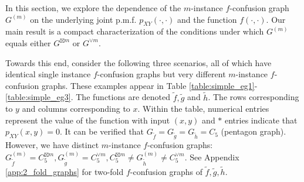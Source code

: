 \documentclass[journal, onecolumn, draftcls]{IEEEtran}
\theoremstyle{definition}
\begin{document}
In this section, we explore the dependence of the $m$-instance $f$-confusion graph $G^{(m)}$ on the underlying joint p.m.f. $p_{XY}(\cdot, \cdot)$ and the function $f(\cdot, \cdot)$. Our main result is a compact characterization of the conditions under which $G^{(m)}$ equals either $G^{\boxtimes m}$ or $G^{\lor m}$.

Towards this end, consider the following three scenarios, all of which have identical single instance $f$-confusion graphs but very different $m$-instance $f$-confusion graphs. These examples appear in  Table \ref{table:simple_eg1}-\ref{table:simple_eg3}. The functions are denoted $\tilde f,\tilde g$ and $\tilde h$. The rows corresponding to \( y \) and columns corresponding to \( x \). Within the table, numerical entries represent the value of the function with input $(x,y)$ and $*$ entries indicate that $p_{XY}(x,y)=0$. It can be verified that $G_{\tilde f}=G_{\tilde g}=G_{\tilde h}=C_5$ (pentagon graph). However, we have distinct $m$-instance $f$-confusion graphs: $G_{\tilde f}^{(m)}=C_5^{\boxtimes m}, G_{\tilde g}^{(m)}=C_5^{\lor m},C_5^{\boxtimes m}\ne G_{\tilde h}^{(m)}\ne C_5^{\lor m}$. See Appendix \ref{app:2_fold_graphs} for two-fold $f$-confusion graphs of $\tilde f,\tilde g, \tilde h$. %
\end{document}
